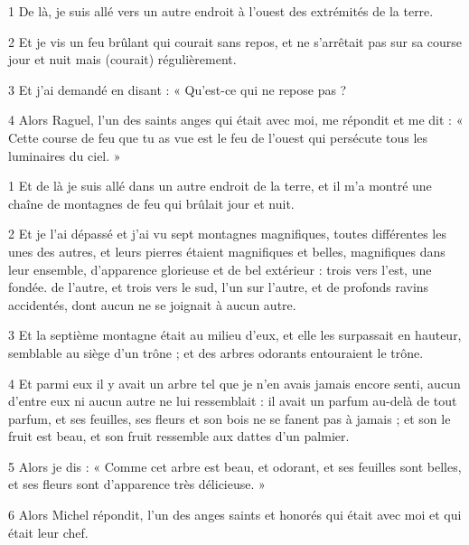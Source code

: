 
\par 1 De là, je suis allé vers un autre endroit à l'ouest des extrémités de la terre.
\par 2 Et je vis un feu brûlant qui courait sans repos, et ne s'arrêtait pas sur sa course jour et nuit mais (courait) régulièrement.
\par 3 Et j'ai demandé en disant : « Qu'est-ce qui ne repose pas ?
\par 4 Alors Raguel, l'un des saints anges qui était avec moi, me répondit et me dit : « Cette course de feu que tu as vue est le feu de l'ouest qui persécute tous les luminaires du ciel. »


\par 1 Et de là je suis allé dans un autre endroit de la terre, et il m'a montré une chaîne de montagnes de feu qui brûlait jour et nuit.
\par 2 Et je l'ai dépassé et j'ai vu sept montagnes magnifiques, toutes différentes les unes des autres, et leurs pierres étaient magnifiques et belles, magnifiques dans leur ensemble, d'apparence glorieuse et de bel extérieur : trois vers l'est, une fondée. de l'autre, et trois vers le sud, l'un sur l'autre, et de profonds ravins accidentés, dont aucun ne se joignait à aucun autre.
\par 3 Et la septième montagne était au milieu d'eux, et elle les surpassait en hauteur, semblable au siège d'un trône ; et des arbres odorants entouraient le trône.
\par 4 Et parmi eux il y avait un arbre tel que je n'en avais jamais encore senti, aucun d'entre eux ni aucun autre ne lui ressemblait : il avait un parfum au-delà de tout parfum, et ses feuilles, ses fleurs et son bois ne se fanent pas à jamais ; et son le fruit est beau, et son fruit ressemble aux dattes d'un palmier.
\par 5 Alors je dis : « Comme cet arbre est beau, et odorant, et ses feuilles sont belles, et ses fleurs sont d'apparence très délicieuse. »
\par 6 Alors Michel répondit, l'un des anges saints et honorés qui était avec moi et qui était leur chef.


